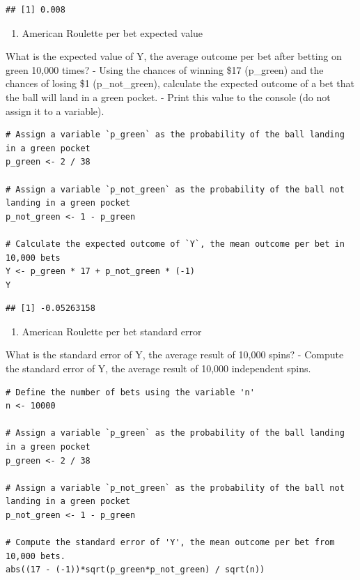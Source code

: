 \documentclass[
]{article}
\providecommand{\tightlist}{%
  \setlength{\itemsep}{0pt}\setlength{\parskip}{0pt}}
\begin{document}
\begin{verbatim}
## [1] 0.008
\end{verbatim}

\begin{enumerate}
\def\labelenumi{\arabic{enumi}.}
\setcounter{enumi}{5}
\tightlist
\item
  American Roulette per bet expected value
\end{enumerate}

What is the expected value of Y, the average outcome per bet after
betting on green 10,000 times? - Using the chances of winning \$17
(p\_green) and the chances of losing \$1 (p\_not\_green), calculate the
expected outcome of a bet that the ball will land in a green pocket. -
Print this value to the console (do not assign it to a variable).

\begin{verbatim}
# Assign a variable `p_green` as the probability of the ball landing in a green pocket
p_green <- 2 / 38

# Assign a variable `p_not_green` as the probability of the ball not landing in a green pocket
p_not_green <- 1 - p_green

# Calculate the expected outcome of `Y`, the mean outcome per bet in 10,000 bets
Y <- p_green * 17 + p_not_green * (-1)
Y
\end{verbatim}

\begin{verbatim}
## [1] -0.05263158
\end{verbatim}

\begin{enumerate}
\def\labelenumi{\arabic{enumi}.}
\setcounter{enumi}{6}
\tightlist
\item
  American Roulette per bet standard error
\end{enumerate}

What is the standard error of Y, the average result of 10,000 spins? -
Compute the standard error of Y, the average result of 10,000
independent spins.

\begin{verbatim}
# Define the number of bets using the variable 'n'
n <- 10000

# Assign a variable `p_green` as the probability of the ball landing in a green pocket
p_green <- 2 / 38

# Assign a variable `p_not_green` as the probability of the ball not landing in a green pocket
p_not_green <- 1 - p_green

# Compute the standard error of 'Y', the mean outcome per bet from 10,000 bets.
abs((17 - (-1))*sqrt(p_green*p_not_green) / sqrt(n))
\end{verbatim}
\end{document}
